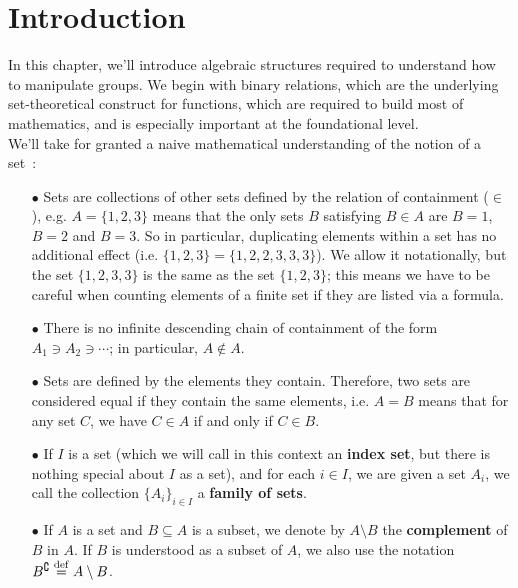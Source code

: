 
\section{Introduction}

In this chapter, we'll introduce algebraic structures required to understand how to manipulate groups. We begin with binary relations, which are the underlying set-theoretical construct for functions, which are required to build most of mathematics, and is especially important at the foundational level.
\\

We'll take for granted a naive mathematical understanding of the notion of a set~:
\\

\begin{itemize}
	\item[$\bullet$] Sets are collections of other sets defined by the relation of containment ($\in$), e.g. $A = \{1,2,3\}$ means that the only sets $B$ satisfying $B \in A$ are $B=1$, $B=2$ and $B=3$. So in particular, duplicating elements within a set has no additional effect (i.e. $\{1,2,3\} = \{1,2,2,3,3,3\}$). We allow it notationally, but the set $\{1,2,3,3\}$ is the same as the set $\{1,2,3\}$; this means we have to be careful when counting elements of a finite set if they are listed via a formula.
	\\

	\item[$\bullet$] There is no infinite descending chain of containment of the form $A_1 \ni A_2 \ni \cdots$; in particular, $A \notin A$.
	\\

	\item[$\bullet$] Sets are defined by the elements they contain. Therefore, two sets are considered equal if they contain the same elements, i.e. $A=B$ means that for any set $C$, we have $C \in A$ if and only if $C \in B$. 
	\\

	\item[$\bullet$] If $I$ is a set (which we will call in this context an \textbf{index set}, but there is nothing special about $I$ as a set), and for each $i \in I$, we are given a set $A_i$, we call the collection $\{A_i\}_{i \in I}$ a \textbf{family of sets}.
	\\

	\item[$\bullet$] If $A$ is a set and $B \subseteq A$ is a subset, we denote by $A \setminus B$ the \textbf{complement} of $B$ in $A$. If $B$ is understood as a subset of $A$, we also use the notation $B^{\complement} \overset{\mathrm{def}}{=} A \setminus B$. 
	\\
\end{itemize}

